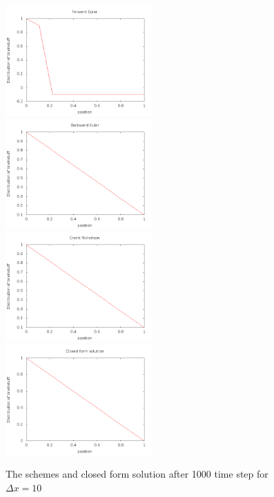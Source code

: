 \documentclass[a4wide,12pt]{article}
\begin{document}
\begin{figure}[hbtp]
	\includegraphics[width=0.5\textwidth]{Forwarddx101000}
	\includegraphics[width=0.5\textwidth]{Backwarddx101000}
	\includegraphics[width=0.5\textwidth]{Crankdx101000}
	\includegraphics[width=0.5\textwidth]{Closedform101000}
	\caption{The schemes and closed form solution after 1000 time step for $\Delta x = 10$}
	\label{fig:03}
\end{figure}
\end{document}
